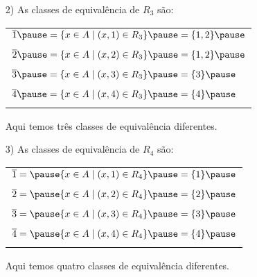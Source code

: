 \documentclass{beamer}
\begin{document}
    \begin{frame}
        \begin{exemplos}
            \begin{enumerate}
                \item[2)] As classes de equival\^encia de $R_3$ s\~ao: \pause
                \begin{center}
                    \begin{tabular}{l}
                        $\overline{1} \pause = \{x \in A \mid (x,1) \in R_3\} \pause = \{1,2\} \pause$\\ \\
                        $\overline{2} \pause = \{x \in A \mid (x,2) \in R_3\} \pause = \{1,2\} \pause$\\ \\
                        $\overline{3} \pause = \{x \in A \mid (x,3) \in R_3\} \pause = \{3\} \pause$\\ \\
                        $\overline{4} \pause = \{x \in A \mid (x,4) \in R_3\} \pause = \{4\} \pause$\\ \\
                    \end{tabular}
                \end{center}
                Aqui temos tr\^es classes de equival\^encia diferentes.
            \end{enumerate}
        \end{exemplos}
    \end{frame}
    \begin{frame}
        \begin{exemplos}
            \begin{enumerate}
                \item[3)] As classes de equival\^encia de $R_4$ s\~ao:\pause
                \begin{center}
                    \begin{tabular}{l}
                        $\overline{1} = \pause \{x \in A \mid (x,1) \in R_4\} \pause = \{1\}\pause$\\ \\
                        $\overline{2} = \pause \{x \in A \mid (x,2) \in R_4\} \pause = \{2\}\pause$\\ \\
                        $\overline{3} = \pause \{x \in A \mid (x,3) \in R_4\} \pause = \{3\}\pause$\\ \\
                        $\overline{4} = \pause \{x \in A \mid (x,4) \in R_4\} \pause = \{4\}\pause$\\ \\
                    \end{tabular}
                \end{center}
                Aqui temos quatro classes de equival\^encia diferentes.
            \end{enumerate}
        \end{exemplos}
    \end{frame}
\end{document}
